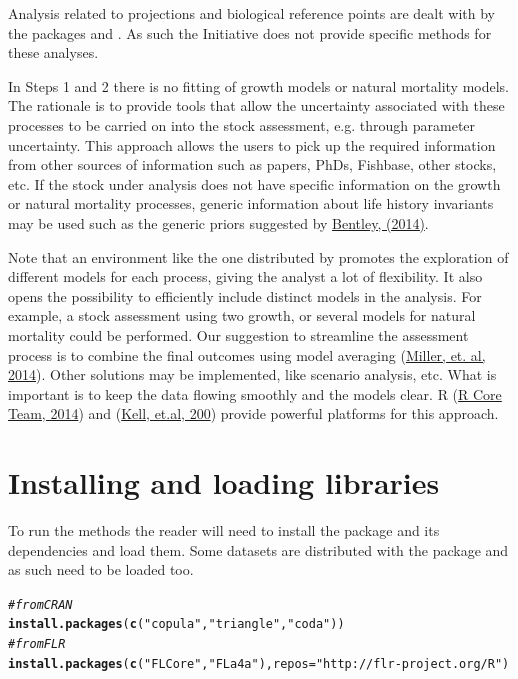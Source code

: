 \documentclass[a4paper,english,10pt]{article}\usepackage[]{graphicx}\usepackage[]{color}
\makeatletter
\newcommand{\hlstr}[1]{\textcolor[rgb]{0.192,0.494,0.8}{#1}}%
\newcommand{\hlcom}[1]{\textcolor[rgb]{0.678,0.584,0.686}{\textit{#1}}}%
\newcommand{\hlstd}[1]{\textcolor[rgb]{0.345,0.345,0.345}{#1}}%
\newcommand{\hlkwc}[1]{\textcolor[rgb]{0.333,0.667,0.333}{#1}}%
\newcommand{\hlkwd}[1]{\textcolor[rgb]{0.737,0.353,0.396}{\textbf{#1}}}%
\newenvironment{kframe}{%
 \def\at@end@of@kframe{}%
 \ifinner\ifhmode%
  \def\at@end@of@kframe{\end{minipage}}%
  \begin{minipage}{\columnwidth}%
 \fi\fi%
 \def\FrameCommand##1{\hskip\@totalleftmargin \hskip-\fboxsep
 \colorbox{shadecolor}{##1}\hskip-\fboxsep
     \hskip-\linewidth \hskip-\@totalleftmargin \hskip\columnwidth}%
 \MakeFramed {\advance\hsize-\width
   \@totalleftmargin\z@ \linewidth\hsize
   \@setminipage}}%
 {\par\unskip\endMakeFramed%
 \at@end@of@kframe}
\newenvironment{knitrout}{}{} %
\makeatother
\begin{document}
Analysis related to projections and biological reference points are dealt with by the  packages  and . As such the Initiative does not provide specific methods for these analyses.

In Steps 1 and 2 there is no fitting of growth models or natural mortality models. The rationale is to provide tools that allow the uncertainty associated with these processes to be carried on into the stock assessment, e.g. through parameter uncertainty. This approach allows the users to pick up the required information from other sources of information such as papers, PhDs, Fishbase, other stocks, etc. If the stock under analysis does not have specific information on the growth or natural mortality processes, generic information about life history invariants may be used such as the generic priors suggested by \href{http://icesjms.oxfordjournals.org/content/early/2014/03/04/icesjms.fsu023.abstract}{Bentley, (2014)}.

Note that an environment like the one distributed by \aFa promotes the exploration of different models for each process, giving the analyst a lot of flexibility. It also opens the possibility to efficiently include distinct models in the analysis. For example, a stock assessment using two growth, or several models for natural mortality could be performed. Our suggestion to streamline the assessment process is to combine the final outcomes using model averaging (\href{http://icesjms.oxfordjournals.org/content/early/2014/03/31/icesjms.fsu043.abstract}{Miller, et. al, 2014}). Other solutions may be implemented, like scenario analysis, etc. What is important is to keep the data flowing smoothly and the models clear. R (\href{http://www.R-project.org/}{R Core Team, 2014}) and  (\href{http://icesjms.oxfordjournals.org/content/64/4/640.abstract}{Kell, et.al, 200}) provide powerful platforms for this approach.


\section{Installing and loading libraries}

To run the  methods the reader will need to install the package and its dependencies and load them. Some datasets are distributed with the package and as such need to be loaded too.

\begin{knitrout}
\color{fgcolor}\begin{kframe}
\begin{alltt}
\hlcom{# from CRAN}
\hlkwd{install.packages}\hlstd{(}\hlkwd{c}\hlstd{(}\hlstr{"copula"}\hlstd{,}\hlstr{"triangle"}\hlstd{,} \hlstr{"coda"}\hlstd{))}
\hlcom{# from FLR}
\hlkwd{install.packages}\hlstd{(}\hlkwd{c}\hlstd{(}\hlstr{"FLCore"}\hlstd{,} \hlstr{"FLa4a"}\hlstd{),} \hlkwc{repos}\hlstd{=}\hlstr{"http://flr-project.org/R"}\hlstd{)}
\end{alltt}
\end{kframe}
\end{knitrout}
\end{document}
